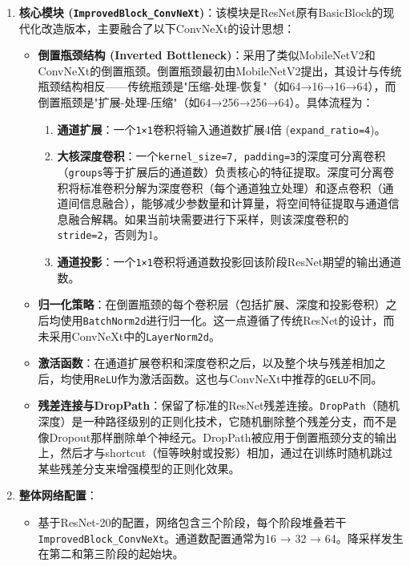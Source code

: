 \documentclass[a4paper]{article}
\begin{document}
\begin{description}
\begin{enumerate}
    \item \textbf{核心模块 (\texttt{ImprovedBlock\_ConvNeXt})}：该模块是ResNet原有BasicBlock的现代化改造版本，主要融合了以下ConvNeXt的设计思想：
    \begin{itemize}
        \item \textbf{倒置瓶颈结构 (Inverted Bottleneck)}：采用了类似MobileNetV2和ConvNeXt的倒置瓶颈。倒置瓶颈最初由MobileNetV2提出，其设计与传统瓶颈结构相反——传统瓶颈是"压缩-处理-恢复"（如64→16→16→64），而倒置瓶颈是"扩展-处理-压缩"（如64→256→256→64）。具体流程为：
        \begin{enumerate}
            \item \textbf{通道扩展}：一个\texttt{1×1}卷积将输入通道数扩展4倍 (\texttt{expand\_ratio=4})。
            \item \textbf{大核深度卷积}：一个\texttt{kernel\_size=7, padding=3}的深度可分离卷积（\texttt{groups}等于扩展后的通道数）负责核心的特征提取。深度可分离卷积将标准卷积分解为深度卷积（每个通道独立处理）和逐点卷积（通道间信息融合），能够减少参数量和计算量，将空间特征提取与通道信息融合解耦。如果当前块需要进行下采样，则该深度卷积的\texttt{stride=2}，否则为1。
            \item \textbf{通道投影}：一个\texttt{1×1}卷积将通道数投影回该阶段ResNet期望的输出通道数。
        \end{enumerate}
        \item \textbf{归一化策略}：在倒置瓶颈的每个卷积层（包括扩展、深度和投影卷积）之后均使用\texttt{BatchNorm2d}进行归一化。这一点遵循了传统ResNet的设计，而未采用ConvNeXt中的\texttt{LayerNorm2d}。
        \item \textbf{激活函数}：在通道扩展卷积和深度卷积之后，以及整个块与残差相加之后，均使用\texttt{ReLU}作为激活函数。这也与ConvNeXt中推荐的\texttt{GELU}不同。
        \item \textbf{残差连接与DropPath}：保留了标准的ResNet残差连接。\texttt{DropPath}（随机深度）是一种路径级别的正则化技术，它随机删除整个残差分支，而不是像Dropout那样删除单个神经元。DropPath被应用于倒置瓶颈分支的输出上，然后才与shortcut（恒等映射或投影）相加，通过在训练时随机跳过某些残差分支来增强模型的正则化效果。
    \end{itemize}
    
    \item \textbf{整体网络配置}：
    \begin{itemize}
        \item 基于ResNet-20的配置，网络包含三个阶段，每个阶段堆叠若干\texttt{ImprovedBlock\_ConvNeXt}。通道数配置通常为16 → 32 → 64。降采样发生在第二和第三阶段的起始块。
    \end{itemize}
\end{enumerate}


\end{description}
\end{document}
